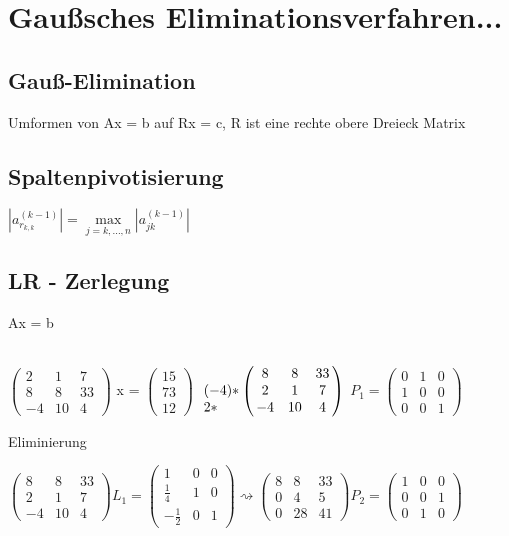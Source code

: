 \documentclass[12pt,a4paper]{article} %
\begin{document}
	\newpage
	
	\section{Gaußsches Eliminationsverfahren...}
	
	\subsection{Gauß-Elimination}
	
	Umformen von Ax = b auf Rx = c, R ist eine rechte obere Dreieck Matrix
	
	\subsection{Spaltenpivotisierung}
	
	$|a_{r_{k, k}}^{(k - 1)}| = \max\limits_{j = k, ..., n}|a_{jk}^{(k - 1)}|$
	
	\subsection{LR - Zerlegung}
	
	Ax = b
	
	$\begin{pmatrix}
		2 & 1 & 7 \\
		8 & 8 & 33 \\
		-4 & 10 & 4
	\end{pmatrix}$
	x =
	$\begin{pmatrix}
		15 \\
		73 \\
		12
	\end{pmatrix}$
	$\bordermatrix{ ~ & & & \cr
		 & 8 & 8 & 33 \cr
		(-4) * & 2 & 1 & 7 \cr
		2 * & -4 & 10 & 4
	}$
	$P_1 = \begin{pmatrix}
		0 & 1 & 0 \\
		1 & 0 & 0 \\
		0 & 0 & 1
	\end{pmatrix}$
	
	Eliminierung
	
	$\begin{pmatrix}
		8 & 8 & 33 \\
		2 & 1 & 7 \\
		-4 & 10 & 4
	\end{pmatrix}
	L_1 = \begin{pmatrix}
		1 & 0 & 0 \\
		\frac{1}{4} & 1 & 0 \\
		-\frac{1}{2} & 0 & 1
	\end{pmatrix}
	\rightsquigarrow
	\begin{pmatrix}
		8 & 8 & 33 \\
		0 & 4 & 5 \\
		0 & 28 & 41
	\end{pmatrix}
	P_2 = \begin{pmatrix}
		1 & 0 & 0 \\
		0 & 0 & 1 \\
		0 & 1 & 0
	\end{pmatrix}$
	
\end{document}
